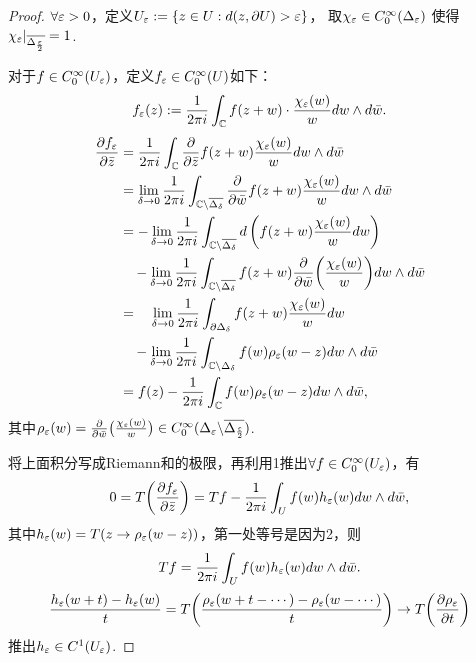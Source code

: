 \begin{proof}
	$\forall \varepsilon >0$，定义$U_\varepsilon:=\{z\in U: d(z,\partial U)>\varepsilon\}$，
    取$\chi_\varepsilon\in C_0^\infty(\Delta_\varepsilon)$
    使得$\chi_\varepsilon|_{\overline{\Delta_{\frac{\varepsilon}{2}}}}=1$. 

	对于$f\in C^\infty_0(U_\varepsilon)$，定义$f_\varepsilon \in C^\infty_0(U)$如下：
	$$f_\varepsilon(z):=\frac{1}{2\pi i} \int_{\mathbb{C}} f(z+w)\cdot \frac{\chi_\varepsilon(w)}{w} dw\wedge d\bar{w}.$$
	\begin{align*}
		\frac{\partial f_\varepsilon}{\partial \bar{z}}
        &=\frac{1}{2\pi i}\int_{\mathbb{C}} \frac{\partial}{\partial \bar{z}}
        f(z+w)\frac{\chi_\varepsilon(w)}{w} dw\wedge d\bar{w}\\
		&=\lim_{\delta \to 0} \frac{1}{2\pi i} 
        \int_{\mathbb{C}\backslash \overline{\Delta_\delta}} 
        \frac{\partial}{\partial \bar{w}} f(z+w)
        \frac{\chi_\varepsilon(w)}{w}dw\wedge d\bar{w}\\
		&=-\lim_{\delta \to 0} \frac{1}{2\pi i} 
        \int_{\mathbb{C}\backslash \overline{\Delta_\delta}} 
        d\left(f(z+w)\frac{\chi_\varepsilon(w)}{w}dw\right)\\
        &\quad-\lim_{\delta \to 0}\frac{1}{2\pi i} 
        \int_{\mathbb{C}\backslash \overline{\Delta_\delta}} 
        f(z+w)\frac{\partial}{\partial \bar{w}}
        \bigg(\frac{\chi_\varepsilon(w)}{w}\bigg) dw\wedge d\bar{w}\\
		&=\quad\lim_{\delta\to 0} \frac{1}{2\pi i} 
        \int_{\partial \Delta_\delta} f(z+w)\frac{\chi_\varepsilon(w)}{w}dw\\
        &\quad-\lim_{\delta\to 0} \frac{1}{2\pi i} 
        \int_{\mathbb{C}\backslash \Delta_\delta} f(w) \rho_\varepsilon(w-z)dw\wedge d\bar{w}\\
		&=f(z)-\frac{1}{2\pi i} \int_{\mathbb{C}} f(w) \rho_\varepsilon (w-z)dw\wedge d\bar{w},
	\end{align*}
	其中$\rho_\varepsilon(w)=\frac{\partial}{\partial \bar{w}}\big(\frac{\chi_\varepsilon(w)}{w}\big) 
    \in C^\infty_0(\Delta_\varepsilon \backslash \overline{\Delta_{\frac{\varepsilon}{2}}})$.

	将上面积分写成Riemann和的极限，再利用1推出$\forall f\in C^\infty_0(U_\varepsilon)$，有
	$$0=T\bigg(\frac{\partial f_\varepsilon}{\partial \bar{z}}\bigg)
    =Tf-\frac{1}{2\pi i} \int_U f(w)h_\varepsilon(w)dw\wedge d\bar{w},$$
	其中$h_\varepsilon(w)=T(z\to \rho_\varepsilon(w-z))$，第一处等号是因为2，则
	$$Tf=\frac{1}{2\pi i} \int_U f(w)h_\varepsilon(w)dw\wedge d\bar{w}.$$
	$$\frac{h_\varepsilon(w+t)-h_\varepsilon(w)}{t}
    =T\bigg(\frac{\rho_\varepsilon(w+t-\cdots)-\rho_\varepsilon(w-\cdots)}{t}\bigg)
    \to T\bigg(\frac{\partial \rho_\varepsilon}{\partial t}\bigg)$$
	推出$h_\varepsilon\in C^1(U_\varepsilon)$.


\end{proof}
